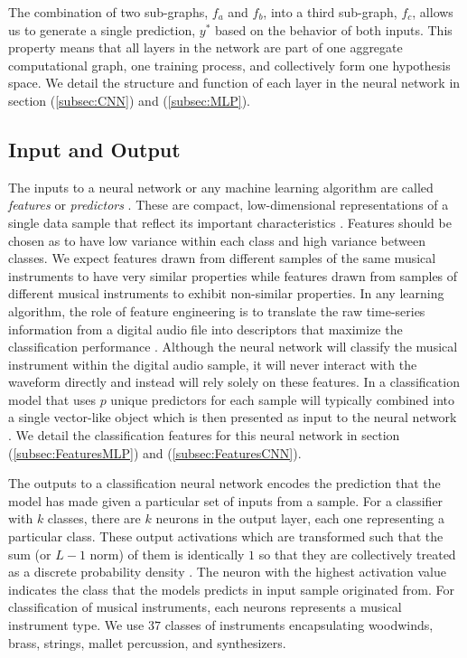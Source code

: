 \documentclass[conference,onecolumn,letterpaper]{IEEEtran}
\begin{document}
The combination of two sub-graphs, $f_a$ and $f_b$, into a third sub-graph, $f_c$, allows us to generate a single prediction, $y^*$ based on the behavior of both inputs. This property means that all layers in the network are part of one aggregate computational graph, one training process, and collectively form one hypothesis space. We detail the structure and function of each layer in the neural network in section (\ref{subsec:CNN}) and (\ref{subsec:MLP}).


\subsection{Input and Output}
\label{subsec:InputOutput}

The inputs to a neural network or any machine learning algorithm are called \textit{features} or \textit{predictors} \cite{James}. These are compact, low-dimensional representations of a single data sample that reflect its important characteristics \cite{Liu}. Features should be chosen as to have low variance within each class and high variance between classes. We expect features drawn from different samples of the same musical instruments to have very similar properties while features drawn from samples of different musical instruments to exhibit non-similar properties. In any learning algorithm, the role of feature engineering is to translate the raw time-series information from a digital audio file into descriptors that maximize the classification performance \cite{Virtanen}. Although the neural network will classify the musical instrument within the digital audio sample, it will never interact with the waveform directly and instead will rely solely on these features. In a classification model that uses $p$ unique predictors for each sample will typically combined into a single vector-like object which is then presented as input to the neural network \cite{Geron}. We detail the classification features for this neural network in section (\ref{subsec:FeaturesMLP}) and (\ref{subsec:FeaturesCNN}). 

The outputs to a classification neural network encodes the prediction that the model has made given a particular set of inputs from a sample. For a classifier with $k$ classes, there are $k$ neurons in the output layer, each one representing a particular class. These output activations which are transformed such that the sum (or $L-1$ norm) of them is identically $1$ so that they are collectively treated as a discrete probability density \cite{Goodfellow,James}. The neuron with the highest activation value indicates the class that the models predicts in input sample originated from. For classification of musical instruments, each neurons represents a musical instrument type. We use $37$ classes of instruments encapsulating woodwinds, brass, strings, mallet percussion, and synthesizers. 
\end{document}
